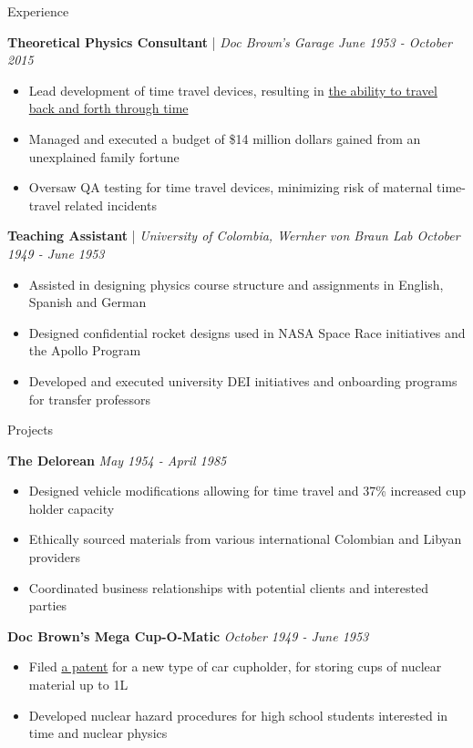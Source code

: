 \documentclass{./resume}
\begin{document}
\begin{rSection}{Experience}

  {\bf Theoretical Physics Consultant} | {\em Doc Brown's Garage \hfill June 1953 - October 2015}
  \vspace{-6pt}
  \begin{itemize}[nosep]
    \item Lead development of time travel devices, resulting in \href{https://simple.wikipedia.org/wiki/Back_to_the_Future_(franchise)}{the ability to travel back and forth through time}
    \item Managed and executed a budget of \$14 million dollars gained from an unexplained family fortune
    \item Oversaw QA testing for time travel devices, minimizing risk of maternal time-travel related incidents
  \end{itemize}
  
  {\bf Teaching Assistant} | {\em University of Colombia, Wernher von Braun Lab \hfill October 1949 - June 1953}
  \vspace{-6pt}
  \begin{itemize}[nosep]
    \item Assisted in designing physics course structure and assignments in English, Spanish and German
    \item Designed confidential rocket designs used in NASA Space Race initiatives and the Apollo Program
    \item Developed and executed university DEI initiatives and onboarding programs for transfer professors
  \end{itemize}
  
\end{rSection}

\begin{rSection}{Projects}
  
  {\bf The Delorean} {\em \hfill May 1954 - April 1985}
  \vspace{-6pt}
  \begin{itemize}[nosep]
    \item Designed vehicle modifications allowing for time travel and 37\% increased cup holder capacity
    \item Ethically sourced materials from various international Colombian and Libyan providers
    \item Coordinated business relationships with potential clients and interested parties
  \end{itemize}
  
  {\bf Doc Brown's Mega Cup-O-Matic} {\em \hfill October 1949 - June 1953}
  \vspace{-6pt}
  \begin{itemize}[nosep]
    \item Filed \href{http://www.patentlyinteresting.com/june-12.html}{a patent} for a new type of car cupholder, for storing cups of nuclear material up to 1L
    \item Developed nuclear hazard procedures for high school students interested in time and nuclear physics
  \end{itemize}

\end{rSection}
\end{document}

